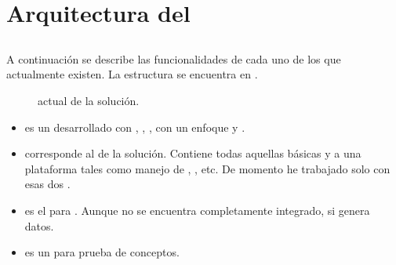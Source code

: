 \section{Arquitectura del \frameworkPC}\label{cap:arquitectura:section:arquitectura_framework}

\subsection{\packagesAS}

A continuación se describe las funcionalidades de cada uno de los \packagesAS que actualmente existen. La estructura se encuentra en .

\begin{figure}[H]
	\centering
	
	
	\caption{\architectureCPT actual de la solución.}
	\label{cap:avances:current_architecture}
\end{figure}
	\begin{itemize}
		\item
			\textbf{\rtcom} es un \frameworkPC \ecommerceCOM desarrollado con \meteorNAME, \nodejsNAME, \mongodbNAME, \coffeescript con un enfoque \reactive y \realTimeINT.
		\item
			\textbf{\rtcomCorePCKG} corresponde al \coreAS de la solución. Contiene todas aquellas \featuresCPT básicas y \templatesAS a una plataforma \ecommerceCOM tales como manejo de \itemsCOM, \sessionsINT, etc. De momento he trabajado solo con esas dos \featuresCPT.
		\item
			\textbf{\rtcomGoogleanalPCKG} es el \moduleAS para \googleanalytics. Aunque no se encuentra completamente integrado, si genera datos.
		\item
			\textbf{\helloworldPCKG} es un \moduleAS para prueba de conceptos.
	\end{itemize}


